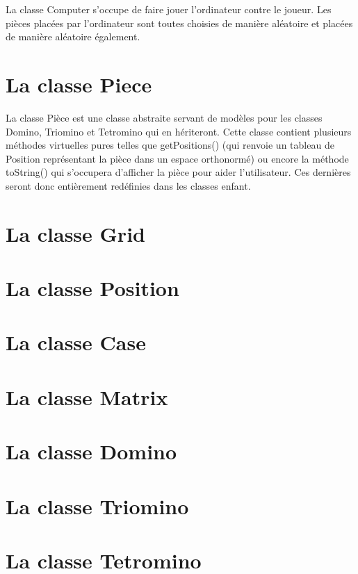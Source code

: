 \documentclass[a4paper, titlepage, french]{report}
\begin{document}
La classe Computer s'occupe de faire jouer l'ordinateur contre le joueur. Les pièces placées
par l'ordinateur sont toutes choisies de manière aléatoire et placées de manière aléatoire également.

\bigskip

\section{La classe Piece}

La classe Pièce est une classe abstraite servant de modèles pour les classes Domino, Triomino et Tetromino
qui en hériteront.
Cette classe contient plusieurs méthodes virtuelles pures telles que getPositions() (qui renvoie un tableau de Position représentant
la pièce dans un espace orthonormé) ou encore la méthode toString() qui s'occupera d'afficher la pièce pour aider
l'utilisateur. Ces dernières seront donc entièrement redéfinies dans les classes enfant.

\bigskip

\section{La classe Grid}
\bigskip

\section{La classe Position}
\bigskip

\section{La classe Case}
\bigskip

\section{La classe Matrix}
\bigskip

\section{La classe Domino}
\bigskip

\section{La classe Triomino}
\bigskip

\section{La classe Tetromino}
\bigskip
\end{document}
